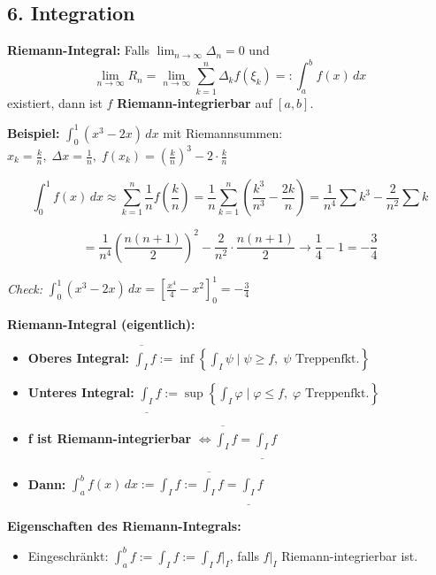 \begin{itemize}
\subsection{6. Integration}

\textbf{Riemann-Integral:}  
Falls \( \lim_{n \to \infty} \Delta_n = 0 \) und  
\[
\lim_{n \to \infty} R_n = \lim_{n \to \infty} \sum_{k=1}^{n} \Delta_k f(\xi_k) =: \int_a^b f(x)\,dx
\]
existiert, dann ist \( f \) \textbf{Riemann-integrierbar} auf \( [a,b] \).

\textbf{Beispiel:} \( \displaystyle \int_0^1 (x^3 - 2x)\,dx \) mit Riemannsummen:  
\( x_k = \frac{k}{n},\; \Delta x = \frac{1}{n},\; f(x_k) = \left( \frac{k}{n} \right)^3 - 2 \cdot \frac{k}{n} \)

\[
\int_0^1 f(x)\,dx \approx \sum_{k=1}^n \frac{1}{n} f\left(\frac{k}{n}\right)
= \frac{1}{n} \sum_{k=1}^n \left( \frac{k^3}{n^3} - \frac{2k}{n} \right)
= \frac{1}{n^4} \sum k^3 - \frac{2}{n^2} \sum k
\]

\[
= \frac{1}{n^4} \left( \frac{n(n+1)}{2} \right)^2 - \frac{2}{n^2} \cdot \frac{n(n+1)}{2}
\to \frac{1}{4} - 1 = -\frac{3}{4}
\]

\textit{Check:}  
\( \int_0^1 (x^3 - 2x)\,dx = \left[ \frac{x^4}{4} - x^2 \right]_0^1 = -\frac{3}{4} \)

\textbf{Riemann-Integral (eigentlich):}
\begin{itemize}
  \item \textbf{Oberes Integral:} 
    \( \overline{\int_I} f := \inf \left\{ \int_I \psi \mid \psi \ge f,\; \psi \text{ Treppenfkt.} \right\} \)
  \item \textbf{Unteres Integral:} 
    \( \underline{\int_I} f := \sup \left\{ \int_I \varphi \mid \varphi \le f,\; \varphi \text{ Treppenfkt.} \right\} \)
  \item \textbf{f ist Riemann-integrierbar} \( \Leftrightarrow \overline{\int_I} f = \underline{\int_I} f \)
  \item \textbf{Dann:} \( \int_a^b f(x)\,dx := \int_I f := \overline{\int_I} f = \underline{\int_I} f \)
\end{itemize}

\textbf{Eigenschaften des Riemann-Integrals:}
\begin{itemize}
  \item Eingeschränkt: \( \int_a^b f := \int_I f := \int_I f|_I \), falls \( f|_I \) Riemann-integrierbar ist.


\end{itemize}
\end{itemize}
